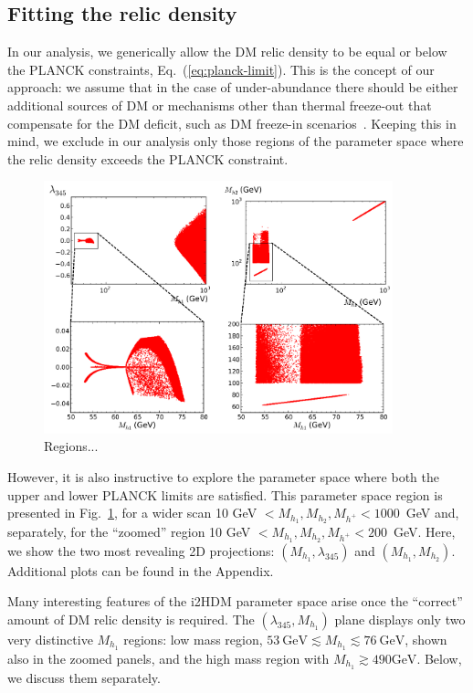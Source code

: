 \documentclass[12pt,a4paper]{article}
\newcommand {\blue} {\color{blue}}
\begin{document}
\subsection{Fitting the relic density}

In our analysis, we generically allow the DM relic density to be equal or
below the PLANCK constraints, Eq.~(\ref{eq:planck-limit}).
This is the concept of our approach: we assume that in the case of under-abundance
there should be either additional sources of DM or mechanisms other than thermal freeze-out that 
compensate for the DM deficit, such as DM freeze-in scenarios~\cite{Hall:2009bx}.
Keeping this in mind, we exclude in our analysis only those regions of the parameter space 
where the relic density exceeds the PLANCK constraint.

\begin{figure}[htb]
\begin{center}
\includegraphics[width=0.9\textwidth]{simplified-fitting.png}
\caption{Regions... \label{fig:scan-simplified-fitting}} 
\end{center}
\end{figure}

{\blue However, it is also instructive to explore the parameter space where both
the upper and lower PLANCK limits are satisfied.
This parameter space region is presented in Fig.~\ref{fig:scan-simplified-fitting},
for a wider scan 10 GeV $< M_{h_1}, M_{h_2}, M_{h^{+}} < 1000$~GeV and, separately,
for the ``zoomed'' region 10 GeV $< M_{h_1}, M_{h_2}, M_{h^{+}} < 200$~GeV.
Here, we show the two most revealing 2D projections: $(M_{h_1},\lambda_{345})$ and $(M_{h_1},M_{h_2})$. 
Additional plots can be found in the Appendix.

Many interesting features of the i2HDM parameter space arise once the ``correct'' amount of DM relic density is required. 
The $(\lambda_{345},M_{h_1})$ plane displays only two very distinctive $M_{h_1}$ regions:  
low mass region, $53~\mbox{GeV} \lesssim M_{h_1} \lesssim 76~\mbox{GeV}$, shown also in the zoomed panels,
and the high mass region with $M_{h_1}\gtrsim 490\mbox{GeV}$. Below, we discuss them separately.}
\end{document}
